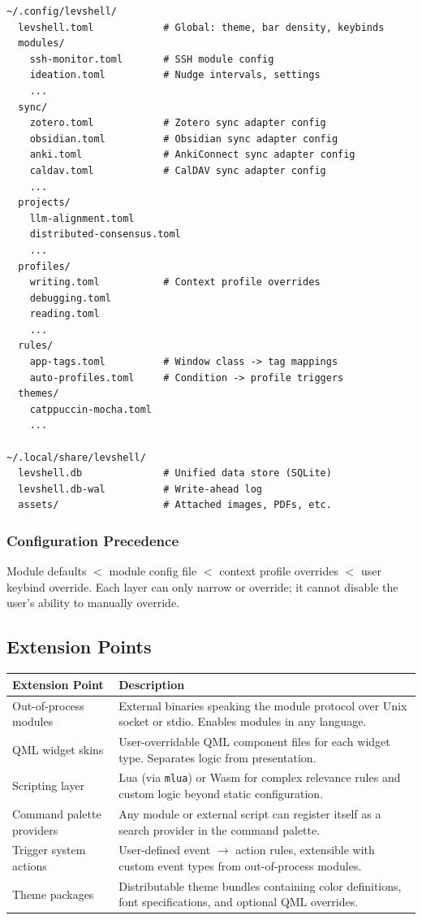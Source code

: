 \documentclass[11pt,a4paper]{article}
\begin{document}
\begin{lstlisting}[language={}]
~/.config/levshell/
  levshell.toml            # Global: theme, bar density, keybinds
  modules/
    ssh-monitor.toml       # SSH module config
    ideation.toml          # Nudge intervals, settings
    ...
  sync/
    zotero.toml            # Zotero sync adapter config
    obsidian.toml          # Obsidian sync adapter config
    anki.toml              # AnkiConnect sync adapter config
    caldav.toml            # CalDAV sync adapter config
    ...
  projects/
    llm-alignment.toml
    distributed-consensus.toml
    ...
  profiles/
    writing.toml           # Context profile overrides
    debugging.toml
    reading.toml
    ...
  rules/
    app-tags.toml          # Window class -> tag mappings
    auto-profiles.toml     # Condition -> profile triggers
  themes/
    catppuccin-mocha.toml
    ...

~/.local/share/levshell/
  levshell.db              # Unified data store (SQLite)
  levshell.db-wal          # Write-ahead log
  assets/                  # Attached images, PDFs, etc.
\end{lstlisting}

\subsubsection{Configuration Precedence}
Module defaults $<$ module config file $<$ context profile overrides $<$ user keybind override. Each layer can only narrow or override; it cannot disable the user's ability to manually override.


\subsection{Extension Points}
\label{sec:extensions}

\begin{longtable}{p{4cm} p{9.5cm}}
\toprule
\textbf{Extension Point} & \textbf{Description} \\
\midrule
Out-of-process modules & External binaries speaking the module protocol over Unix socket or stdio. Enables modules in any language. \\
QML widget skins & User-overridable QML component files for each widget type. Separates logic from presentation. \\
Scripting layer & Lua (via \texttt{mlua}) or Wasm for complex relevance rules and custom logic beyond static configuration. \\
Command palette providers & Any module or external script can register itself as a search provider in the command palette. \\
Trigger system actions & User-defined event $\to$ action rules, extensible with custom event types from out-of-process modules. \\
Theme packages & Distributable theme bundles containing color definitions, font specifications, and optional QML overrides. \\
\bottomrule
\end{longtable}
\end{document}
